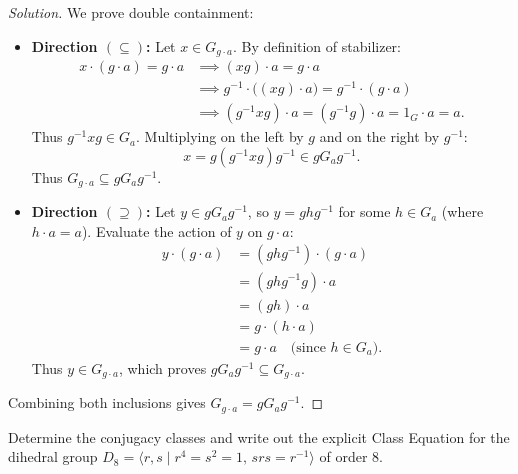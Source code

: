 \begin{proof}[Solution]
We prove double containment:
\begin{itemize}[leftmargin=1.5em, itemsep=6pt]
    \item \textbf{Direction $(\subseteq)$:}
    Let $x \in G_{g \cdot a}$.
    By definition of stabilizer:
    \begin{align*}
    x \cdot (g \cdot a) = g \cdot a 
    &\implies (xg) \cdot a = g \cdot a \\
    &\implies g^{-1} \cdot \bigl((xg) \cdot a\bigr) = g^{-1} \cdot (g \cdot a) \\
    &\implies (g^{-1}xg) \cdot a = (g^{-1}g) \cdot a = 1_G \cdot a = a.
    \end{align*}
    Thus $g^{-1}xg \in G_a$.
    Multiplying on the left by $g$ and on the right by $g^{-1}$:
    \begin{equation*}
    x = g(g^{-1}xg)g^{-1} \in g G_a g^{-1}.
    \end{equation*}
    Thus $G_{g \cdot a} \subseteq g G_a g^{-1}$.

    \item \textbf{Direction $(\supseteq)$:}
    Let $y \in g G_a g^{-1}$, so $y = g h g^{-1}$ for some $h \in G_a$ (where $h \cdot a = a$).
    Evaluate the action of $y$ on $g \cdot a$:
    \begin{align*}
    y \cdot (g \cdot a) &= (g h g^{-1}) \cdot (g \cdot a) \\
    &= (g h g^{-1} g) \cdot a \\
    &= (gh) \cdot a \\
    &= g \cdot (h \cdot a) \\
    &= g \cdot a \quad \text{(since $h \in G_a$)}.
    \end{align*}
    Thus $y \in G_{g \cdot a}$, which proves $g G_a g^{-1} \subseteq G_{g \cdot a}$.
\end{itemize}
Combining both inclusions gives $G_{g \cdot a} = g G_a g^{-1}$.
\end{proof}

\begin{problem}
Determine the conjugacy classes and write out the explicit Class Equation for the dihedral group $D_8 = \langle r, s \mid r^4 = s^2 = 1, \, srs = r^{-1} \rangle$ of order 8.
\end{problem}


